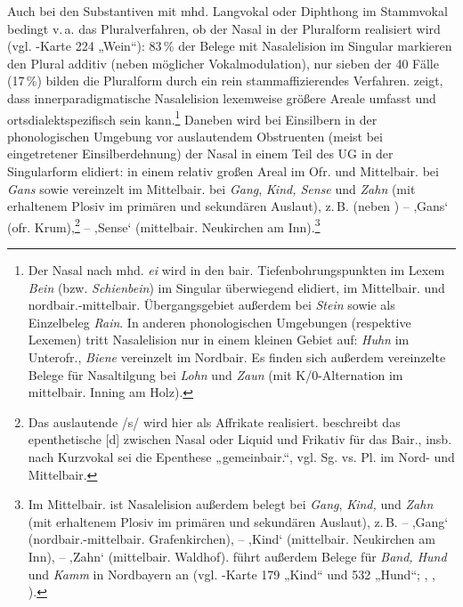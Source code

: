 Auch bei den Substantiven mit mhd. Langvokal oder Diphthong im Stammvokal bedingt v.\,a. das Pluralverfahren, ob der Nasal in der Pluralform realisiert wird (vgl. \citealt{WA}-Karte 224 „Wein“): 83\,\% der Belege mit Nasalelision im Singular markieren den Plural additiv (neben möglicher Vokalmodulation), nur sieben der 40 Fälle (17\,\%) bilden die Pluralform durch ein rein stammaffizierendes Verfahren.  zeigt, dass innerparadigmatische Nasalelision lexemweise größere Areale umfasst und ortsdialektspezifisch sein kann.\footnote{Der Nasal nach mhd. \textit{ei} wird in den bair. Tiefenbohrungspunkten im Lexem \textit{Bein} (bzw. \textit{Schienbein}) im Singular überwiegend elidiert, im Mittelbair. und nordbair.-mittelbair. Übergangsgebiet außerdem bei \textit{Stein} sowie als Einzelbeleg \textit{Rain}. In anderen phonologischen Umgebungen (respektive Lexemen) tritt Nasal\-elision nur in einem kleinen Gebiet auf: \textit{Huhn} im Unterofr., \textit{Biene} vereinzelt im Nordbair. Es finden sich außerdem vereinzelte Belege für Nasaltilgung bei \textit{Lohn} und \textit{Zaun} (mit K/0-Alternation im mittelbair. Inning am Holz).} Daneben wird bei Einsilbern in der phonologischen Umgebung vor auslautendem Obstruenten (meist bei eingetretener Einsilberdehnung) der Nasal in einem Teil des UG in der Singularform elidiert: in einem relativ großen Areal im Ofr. und Mittelbair. bei \textit{Gans} sowie vereinzelt im Mittelbair. bei \textit{Gang}, \textit{Kind, Sense} und \textit{Zahn} (mit erhaltenem Plosiv im primären und sekundären Auslaut), z.\,B.  (neben ) --  ‚Gans‘ (ofr. Krum),\footnote{Das auslautende /s/ wird hier als Affrikate realisiert. \citet[§34h1]{Kranzmayer1956} beschreibt das epenthetische [d] zwischen Nasal oder Liquid und Frikativ für das Bair., insb. nach Kurzvokal sei die Epenthese „gemeinbair.“, vgl. Sg.  vs. Pl.  im Nord- und Mittelbair.}  --  ‚Sense‘ (mittelbair. Neukirchen am Inn).\footnote{Im Mittelbair. ist Nasalelision außerdem belegt bei \textit{Gang}, \textit{Kind,} und \textit{Zahn} (mit erhaltenem Plosiv im primären und sekundären Auslaut), z.\,B.  --  ‚Gang‘ (nordbair.-mittelbair. Grafenkirchen),    --  ‚Kind‘ (mittelbair. Neukirchen am Inn),  --  ‚Zahn‘ (mittelbair. Waldhof). \citet[75, 125]{Rowley1997} führt außerdem Belege für \textit{Band, Hund} und \textit{Kamm} in Nordbayern an (vgl. \citealt{WA}-Karte 179 „Kind“ und 532 „Hund“; \citealt[§46e und Karte 23]{Kranzmayer1956}, \citealt[16/112]{Roth1940}, \citealt[74 und Karte 16]{Rowley1997}).}


